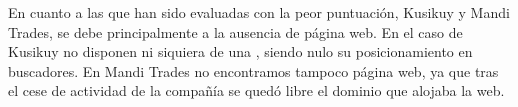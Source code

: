En cuanto a las que han sido evaluadas con la peor puntuación, Kusikuy y Mandi Trades, se debe principalmente a la ausencia de página web. En el caso de Kusikuy no disponen ni siquiera de una , siendo nulo su posicionamiento en buscadores. En Mandi Trades no encontramos tampoco página web, ya que tras el cese de actividad de la compañía se quedó libre el dominio que alojaba la web.